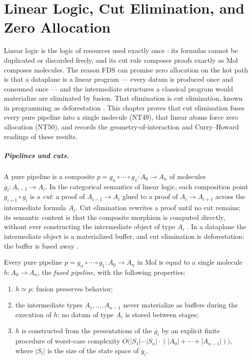 \chapter{Linear Logic, Cut Elimination, and Zero Allocation}\label{ch:linear}

Linear logic is the logic of resources used exactly once \citep{girard}: its formulas cannot be duplicated or discarded freely, and its cut rule composes proofs exactly as Mol composes molecules. The reason FDS can promise zero allocation on the hot path is that a dataplane is a linear program --- every datum is produced once and consumed once --- and the intermediate structures a classical program would materialize are eliminated by fusion. That elimination is cut elimination, known in programming as deforestation \citep{wadler}. This chapter proves that cut elimination fuses every pure pipeline into a single molecule (NT49), that linear atoms force zero allocation (NT50), and records the geometry-of-interaction and Curry--Howard readings of these results.

\paragraph{Pipelines and cuts.}
A pure pipeline is a composite $p = g_n \circ \cdots \circ g_1 : A_0 \to A_n$ of molecules $g_i : A_{i-1} \to A_i$. In the categorical semantics of linear logic, each composition point $g_{i+1} \circ g_i$ is a \emph{cut}: a proof of $A_{i-1} \to A_i$ glued to a proof of $A_i \to A_{i+1}$ across the intermediate formula $A_i$. Cut elimination rewrites a proof until no cut remains; its semantic content is that the composite morphism is computed directly, without ever constructing the intermediate object of type $A_i$ \citep{girard}. In a dataplane the intermediate object is a materialized buffer, and cut elimination is deforestation: the buffer is fused away \citep{wadler}.

\begin{theorem}\label{nt:49}
Every pure pipeline $p = g_n \circ \cdots \circ g_1 : A_0 \to A_n$ in Mol is equal to a single molecule $h : A_0 \to A_n$, the \emph{fused pipeline}, with the following properties:
\begin{enumerate}
\item $h \simeq p$: fusion preserves behavior;
\item the intermediate types $A_1, \ldots, A_{n-1}$ never materialize as buffers during the execution of $h$: no datum of type $A_i$ is stored between stages;
\item $h$ is constructed from the presentations of the $g_i$ by an explicit finite procedure of worst-case complexity $O\bigl(|S_1| \cdots |S_n| \cdot (|A_0| + \cdots + |A_{n-1}|)\bigr)$, where $|S_i|$ is the size of the state space of $g_i$.
\end{enumerate}
\end{theorem}

